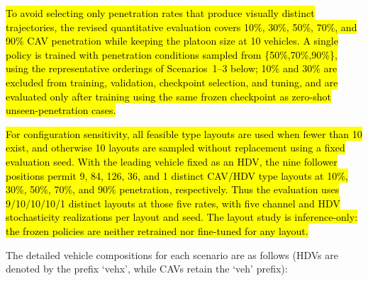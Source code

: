 \documentclass{ieeeaccess}
\begin{document}
\hl{To avoid selecting only penetration rates that produce visually distinct trajectories, the revised quantitative evaluation covers 10\%, 30\%, 50\%, 70\%, and 90\% CAV penetration while keeping the platoon size at 10 vehicles. A single policy is trained with penetration conditions sampled from \{50\%,70\%,90\%\}, using the representative orderings of Scenarios~1--3 below; 10\% and 30\% are excluded from training, validation, checkpoint selection, and tuning, and are evaluated only after training using the same frozen checkpoint as zero-shot unseen-penetration cases.} %

\hl{For configuration sensitivity, all feasible type layouts are used when fewer than 10 exist, and otherwise 10 layouts are sampled without replacement using a fixed evaluation seed. With the leading vehicle fixed as an HDV, the nine follower positions permit 9, 84, 126, 36, and 1 distinct CAV/HDV type layouts at 10\%, 30\%, 50\%, 70\%, and 90\% penetration, respectively. Thus the evaluation uses 9/10/10/10/1 distinct layouts at those five rates, with five channel and HDV stochasticity realizations per layout and seed. The layout study is inference-only: the frozen policies are neither retrained nor fine-tuned for any layout.} %





The detailed vehicle compositions for each scenario are as follows (HDVs are denoted by the prefix `vehx', while CAVs retain the `veh' prefix):
\end{document}
